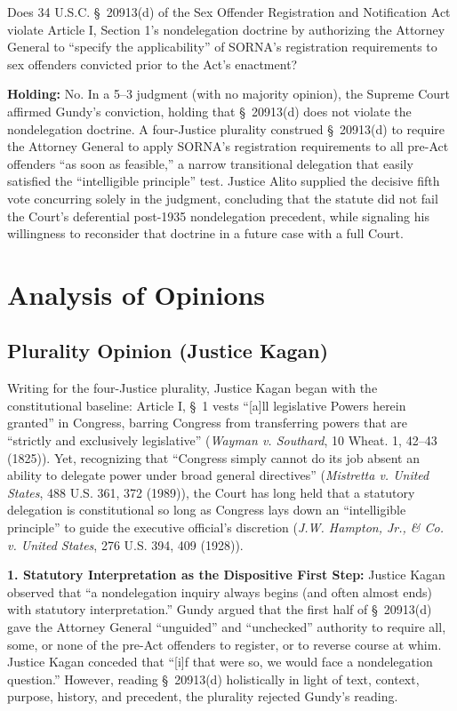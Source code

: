 \documentclass[12pt]{article}
\begin{document}
Does 34 U.S.C. \S~20913(d) of the Sex Offender Registration and Notification Act violate Article I, Section 1's nondelegation doctrine by authorizing the Attorney General to ``specify the applicability'' of SORNA's registration requirements to sex offenders convicted prior to the Act's enactment?

\textbf{Holding:} No. In a 5--3 judgment (with no majority opinion), the Supreme Court affirmed Gundy's conviction, holding that \S~20913(d) does not violate the nondelegation doctrine. A four-Justice plurality construed \S~20913(d) to require the Attorney General to apply SORNA's registration requirements to all pre-Act offenders ``as soon as feasible,'' a narrow transitional delegation that easily satisfied the ``intelligible principle'' test. Justice Alito supplied the decisive fifth vote concurring solely in the judgment, concluding that the statute did not fail the Court's deferential post-1935 nondelegation precedent, while signaling his willingness to reconsider that doctrine in a future case with a full Court.

\section{Analysis of Opinions}
\subsection{Plurality Opinion (Justice Kagan)}

Writing for the four-Justice plurality, Justice Kagan began with the constitutional baseline: Article I, \S~1 vests ``[a]ll legislative Powers herein granted'' in Congress, barring Congress from transferring powers that are ``strictly and exclusively legislative'' (\textit{Wayman v. Southard}, 10 Wheat. 1, 42--43 (1825)). Yet, recognizing that ``Congress simply cannot do its job absent an ability to delegate power under broad general directives'' (\textit{Mistretta v. United States}, 488 U.S. 361, 372 (1989)), the Court has long held that a statutory delegation is constitutional so long as Congress lays down an ``intelligible principle'' to guide the executive official's discretion (\textit{J.W. Hampton, Jr., \& Co. v. United States}, 276 U.S. 394, 409 (1928)).

\textbf{1. Statutory Interpretation as the Dispositive First Step:} Justice Kagan observed that ``a nondelegation inquiry always begins (and often almost ends) with statutory interpretation.'' Gundy argued that the first half of \S~20913(d) gave the Attorney General ``unguided'' and ``unchecked'' authority to require all, some, or none of the pre-Act offenders to register, or to reverse course at whim. Justice Kagan conceded that ``[i]f that were so, we would face a nondelegation question.'' However, reading \S~20913(d) holistically in light of text, context, purpose, history, and precedent, the plurality rejected Gundy's reading.
\end{document}
